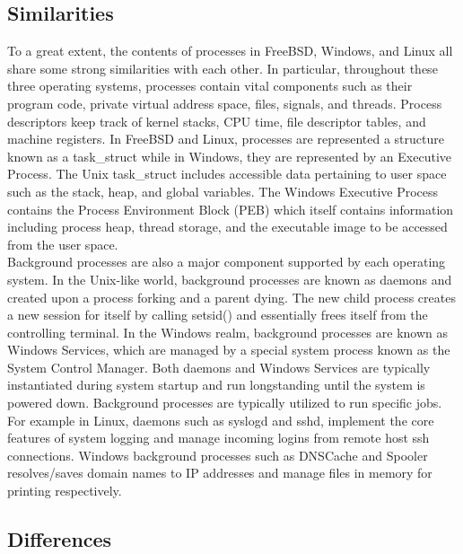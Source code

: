 \documentclass[letterpaper,10pt,titlepage]{article}
\begin{document}
\subsection{Similarities}

To a great extent, the contents of processes in FreeBSD, Windows, and Linux all share some strong similarities with each other.  In particular, throughout these three operating systems, processes contain vital components such as their program code, private virtual address space, files, signals, and threads.  Process descriptors keep track of kernel stacks, CPU time, file descriptor tables, and machine registers.  In FreeBSD and Linux, processes are represented a structure known as a task\_struct while in Windows, they are represented by an Executive Process.  The Unix task\_struct includes accessible data pertaining to user space such as the stack, heap, and global variables.  The Windows Executive Process contains the Process Environment Block (PEB) which itself contains information including process heap, thread storage, and the executable image to be accessed from the user space.\cite{mwi1}\\

Background processes are also a major component supported by each operating system.  In the Unix-like world, background processes are known as daemons and created upon a process forking and a parent dying.  The new child process creates a new session for itself by calling setsid() and essentially frees itself from the controlling terminal.\cite{lkd4}  In the Windows realm, background processes are known as Windows Services, which are managed by a special system process known as the System Control Manager.\cite{mwi5}  Both daemons and Windows Services are typically instantiated during system startup and run longstanding until the system is powered down.  Background processes are typically utilized to run specific jobs.  For example in Linux, daemons such as syslogd and sshd, implement the core features of system logging and manage incoming logins from remote host ssh connections.\cite{syslogd} Windows background processes such as DNSCache and Spooler resolves/saves domain names to IP addresses and manage files in memory for printing respectively.\cite{mwi2}

\subsection{Differences}
\end{document}
